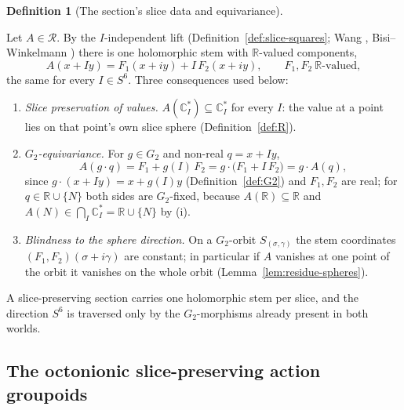\documentclass[11pt]{article}
\newcommand{\CC}{\mathbb{C}}
\newcommand{\RR}{\mathbb{R}}
\providecommand{\Gtwo}{G_2}
\providecommand{\lean}[1]{}
\providecommand{\uses}[1]{}
\theoremstyle{plain}
\theoremstyle{definition}
\newtheorem{definition}[theorem]{Definition}
\theoremstyle{remark}
\begin{document}
\begin{definition}[The section's slice data and equivariance]\label{def:section-map}
\lean{ASection.realize, ASection.realize_mem_sliceSphere,
ASection.realize_equivariant, ASection.sliceCoord_smul_invariant}
\uses{def:slice-squares, def:slice-preserving, thm:rep-formula}
Let $A\in\mathcal R$. By the $I$-independent lift (Definition~\ref{def:slice-squares}; Wang
\cite[Rem.~2.11]{Wang}, Bisi--Winkelmann \cite[\S3.7]{BisiWinkelmann}) there is one holomorphic
stem with $\RR$-valued components,
\[
  A(x+Iy)=F_1(x+iy)+I\,F_2(x+iy),\qquad F_1,F_2\ \RR\text{-valued},
\]
the same for every $I\in S^6$. Three consequences used below:
\begin{enumerate}[label=\textup{(\roman*)},leftmargin=2.6em]
\item \emph{Slice preservation of values.} $A(\CC_I^{*})\subseteq\CC_I^{*}$ for every $I$: the
  value at a point lies on that point's own slice sphere (Definition~\ref{def:R}).
\item \emph{$\Gtwo$-equivariance.} For $g\in\Gtwo$ and non-real $q=x+Iy$,
  \[
    A(g\cdot q)=F_1+g(I)\,F_2=g\cdot\bigl(F_1+I\,F_2\bigr)=g\cdot A(q),
  \]
  since $g\cdot(x+Iy)=x+g(I)y$ (Definition~\ref{def:G2}) and $F_1,F_2$ are real; for
  $q\in\RR\cup\{N\}$ both sides are $\Gtwo$-fixed, because $A(\RR)\subseteq\RR$ and
  $A(N)\in\bigcap_I\CC_I^{*}=\RR\cup\{N\}$ by \textup{(i)}.
\item \emph{Blindness to the sphere direction.} On a $\Gtwo$-orbit $S_{(\sigma,\gamma)}$ the stem
  coordinates $(F_1,F_2)(\sigma+i\gamma)$ are constant; in particular if $A$ vanishes at one
  point of the orbit it vanishes on the whole orbit (Lemma~\ref{lem:residue-spheres}).
\end{enumerate}
A slice-preserving section carries one holomorphic stem per slice, and the direction $S^6$ is
traversed only by the $\Gtwo$-morphisms already present in both worlds.
\end{definition}

\subsection*{The octonionic slice-preserving action groupoids}
\end{document}
